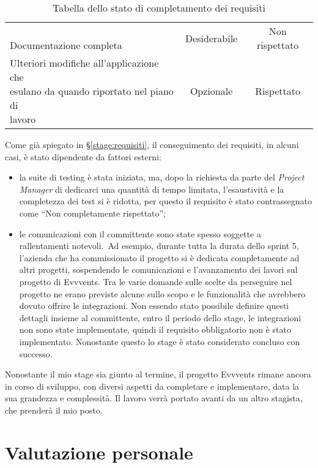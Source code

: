 \begin{table}[h]
\begin{tabularx}{\textwidth}{X|c|c}
		\makecell[l]{\vspace{-6pt} \\ Documentazione completa \\ \vspace{-6pt}} & Desiderabile & Non rispettato \\
		\makecell[l]{Ulteriori modifiche all'applicazione che \\ esulano da quando riportato nel piano di \\ lavoro} & Opzionale & Rispettato
	\end{tabularx}
	\vspace{5pt}
	\caption{Tabella dello stato di completamento dei requisiti}
\end{table}

\noindent Come già spiegato in \S \ref{stage:requisiti}, il conseguimento dei requisiti, in alcuni casi, è stato dipendente da fattori esterni:
\begin{itemize}
	\item la suite di testing è stata iniziata, ma, dopo la richiesta da parte del \emph{Project Manager} di dedicarci una quantità di tempo limitata, l'esaustività e la completezza dei test si è ridotta, per questo il requisito è stato contrassegnato come ``Non completamente rispettato'';
	\item le comunicazioni con il committente sono state spesso soggette a rallentamenti notevoli.\ Ad esempio, durante tutta la durata dello sprint 5, l'azienda che ha commissionato il progetto si è dedicata completamente ad altri progetti, sospendendo le comunicazioni e l'avanzamento dei lavori sul progetto di Evvvents. Tra le varie domande sulle scelte da perseguire nel progetto ne erano previste alcune sullo scopo e le funzionalità che avrebbero dovuto offrire le integrazioni. Non essendo stato possibile definire questi dettagli insieme al committente, entro il periodo dello stage, le integrazioni non sono state implementate, quindi il requisito obbligatorio non è stato implementato. Nonostante questo lo stage è stato considerato concluso con successo.
\end{itemize}
Nonostante il mio stage sia giunto al termine, il progetto Evvvents rimane ancora in corso di sviluppo, con diversi aspetti da completare e implementare, data la sua grandezza e complessità. Il lavoro verrà portato avanti da un altro stagista, che prenderà il mio posto.

\section{Valutazione personale}
